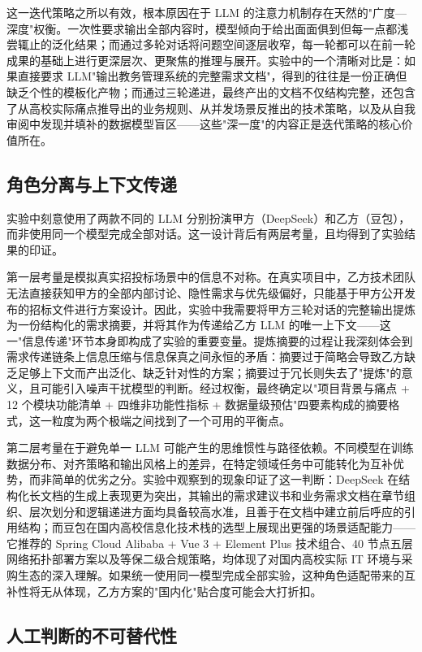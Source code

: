 \documentclass[12pt, a4paper]{academics}
\begin{document}
这一迭代策略之所以有效，根本原因在于 LLM 的注意力机制存在天然的"广度—深度"权衡。一次性要求输出全部内容时，模型倾向于给出面面俱到但每一点都浅尝辄止的泛化结果；而通过多轮对话将问题空间逐层收窄，每一轮都可以在前一轮成果的基础上进行更深层次、更聚焦的推理与展开。实验中的一个清晰对比是：如果直接要求 LLM"输出教务管理系统的完整需求文档"，得到的往往是一份正确但缺乏个性的模板化产物；而通过三轮递进，最终产出的文档不仅结构完整，还包含了从高校实际痛点推导出的业务规则、从并发场景反推出的技术策略，以及从自我审阅中发现并填补的数据模型盲区——这些"深一度"的内容正是迭代策略的核心价值所在。

\subsection{角色分离与上下文传递}

实验中刻意使用了两款不同的 LLM 分别扮演甲方（DeepSeek）和乙方（豆包），而非使用同一个模型完成全部对话。这一设计背后有两层考量，且均得到了实验结果的印证。

第一层考量是模拟真实招投标场景中的信息不对称。在真实项目中，乙方技术团队无法直接获知甲方的全部内部讨论、隐性需求与优先级偏好，只能基于甲方公开发布的招标文件进行方案设计。因此，实验中我需要将甲方三轮对话的完整输出提炼为一份结构化的需求摘要，并将其作为传递给乙方 LLM 的唯一上下文——这一"信息传递"环节本身即构成了实验的重要变量。提炼摘要的过程让我深刻体会到需求传递链条上信息压缩与信息保真之间永恒的矛盾：摘要过于简略会导致乙方缺乏足够上下文而产出泛化、缺乏针对性的方案；摘要过于冗长则失去了"提炼"的意义，且可能引入噪声干扰模型的判断。经过权衡，最终确定以"项目背景与痛点 + 12 个模块功能清单 + 四维非功能性指标 + 数据量级预估"四要素构成的摘要格式，这一粒度为两个极端之间找到了一个可用的平衡点。

第二层考量在于避免单一 LLM 可能产生的思维惯性与路径依赖。不同模型在训练数据分布、对齐策略和输出风格上的差异，在特定领域任务中可能转化为互补优势，而非简单的优劣之分。实验中观察到的现象印证了这一判断：DeepSeek 在结构化长文档的生成上表现更为突出，其输出的需求建议书和业务需求文档在章节组织、层次划分和逻辑递进方面均具备较高水准，且善于在文档中建立前后呼应的引用结构；而豆包在国内高校信息化技术栈的选型上展现出更强的场景适配能力——它推荐的 Spring Cloud Alibaba + Vue 3 + Element Plus 技术组合、40 节点五层网络拓扑部署方案以及等保二级合规策略，均体现了对国内高校实际 IT 环境与采购生态的深入理解。如果统一使用同一模型完成全部实验，这种角色适配带来的互补性将无从体现，乙方方案的"国内化"贴合度可能会大打折扣。

\subsection{人工判断的不可替代性}
\end{document}
